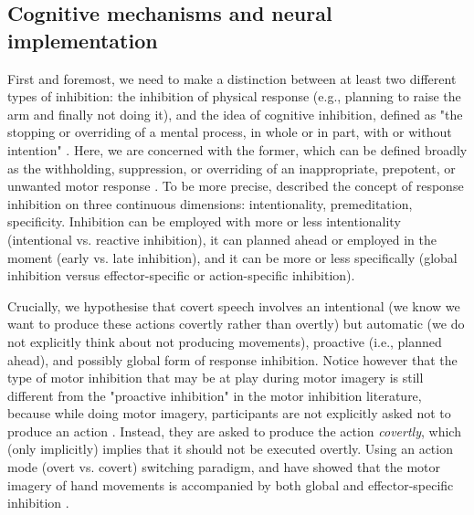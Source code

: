 \documentclass[utf8]{template/frontiersSCNS} %
\begin{document}
\subsection{Cognitive mechanisms and neural implementation}

First and foremost, we need to make a distinction between at least two different types of inhibition: the inhibition of physical response (e.g., planning to raise the arm and finally not doing it), and the idea of cognitive inhibition, defined as "the stopping or overriding of a mental process, in whole or in part, with or without intention" \citep{gorfein_concept_2007}. Here, we are concerned with the former, which can be defined broadly as the withholding, suppression, or overriding of an inappropriate, prepotent, or unwanted motor response \citep{aron_neural_2007, oshea_go_2018}. To be more precise, \cite{ridderinkhof_dont_2014} described the concept of response inhibition on three continuous dimensions: intentionality, premeditation, specificity. Inhibition can be employed with more or less intentionality (intentional vs. reactive inhibition), it can planned ahead or employed in the moment (early vs. late inhibition), and it can be more or less specifically (global inhibition versus effector-specific or action-specific inhibition).

Crucially, we hypothesise that covert speech involves an intentional (we know we want to produce these actions covertly rather than overtly) but automatic (we do not explicitly think about not producing movements), proactive (i.e., planned ahead), and possibly global form of response inhibition. Notice however that the type of motor inhibition that may be at play during motor imagery is still different from the "proactive inhibition" in the motor inhibition literature, because while doing motor imagery, participants are not explicitly asked not to produce an action \citep{guillot_imagining_2012}. Instead, they are asked to produce the action \textit{covertly}, which (only implicitly) implies that it should not be executed overtly. Using an action mode (overt vs. covert) switching paradigm, \cite{rieger_inhibition_2017} and \cite{bart_inhibitory_2021} have showed that the motor imagery of hand movements is accompanied by both global and effector-specific inhibition \citep[these results were also replicated in][]{scheil_motor_2018}.

\end{document}
